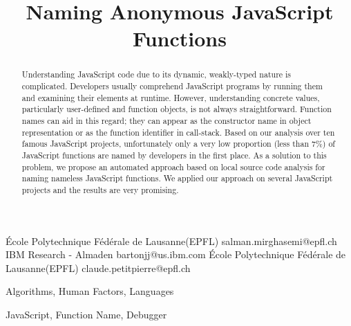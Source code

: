 \documentclass[10pt, preprint]{sigplanconf}
\begin{document}
\copyrightdata{[to be supplied]} 


\title{Naming Anonymous JavaScript Functions}

           {\'Ecole Polytechnique F\'ed\'erale de Lausanne(EPFL)}
           {salman.mirghasemi@epfl.ch}
           {IBM Research - Almaden}
           {bartonjj@us.ibm.com} 
           {\'Ecole Polytechnique F\'ed\'erale de Lausanne(EPFL)}
           {claude.petitpierre@epfl.ch}

\maketitle

\begin{abstract}
Understanding JavaScript code due to its dynamic, weakly-typed nature is complicated. Developers usually comprehend JavaScript programs by running them and examining their elements at runtime. However, understanding concrete values, particularly user-defined and function objects, is not always straightforward. Function names can aid in this regard; they can appear as the constructor name in object representation or as the function identifier in call-stack. Based on our analysis over ten famous JavaScript projects, unfortunately only a very low proportion (less than 7\%) of JavaScript functions are named by developers in the first place. As a solution to this problem, we propose an automated approach based on local source code analysis for naming nameless JavaScript functions. We applied our approach on several JavaScript projects and the results are very promising.
\end{abstract}


\terms
Algorithms, Human Factors, Languages

\keywords
JavaScript, Function Name, Debugger
\end{document}

